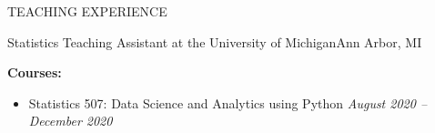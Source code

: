 \begin{rSection}{TEACHING EXPERIENCE} 
%
\begin{rSubsection}{Statistics Teaching Assistant at the University of Michigan}{Ann Arbor, MI}{}{}
\item \textbf{Courses:}
%
    \begin{itemize}[itemsep=-0.4em]
        \vspace*{-0.5em}
        \item Statistics 507: Data Science and Analytics using Python \hfill \textit{August 2020 -- December 2020}
    \end{itemize}


\end{rSubsection}
\end{rSection}
